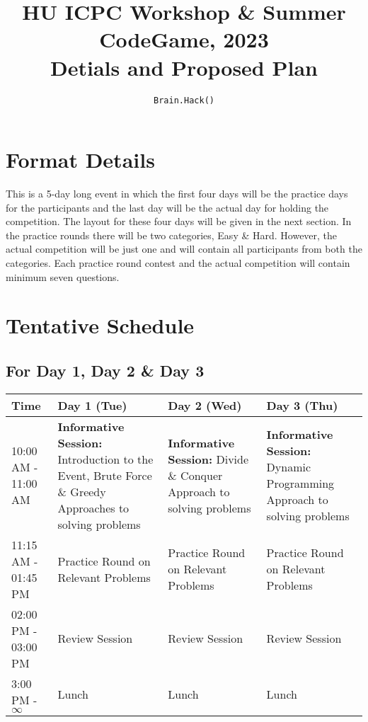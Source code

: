\documentclass[12pt]{article}
\title{HU ICPC Workshop \& Summer CodeGame, 2023 \\ Detials and Proposed Plan}
\author{\texttt{Brain.Hack()}}
\date{}
\begin{document}
\maketitle
\pagebreak

\section*{\centering Format Details}
This is a 5-day long event in which the first four days will be the practice days for the participants and the last day will be the actual day for holding the competition. The layout for these four days will be given in the next section. In the practice rounds there will be two categories, Easy \& Hard. However, the actual competition will be just one and will contain all participants from both the categories. Each practice round contest and the actual competition will contain minimum seven questions.

\section*{\centering Tentative Schedule}
\subsection*{\centering For Day 1, Day 2 \& Day 3}
\begin{table}[H]
    \centering
    \begin{tabular}{|p{2.1cm}|p{4.3cm}|p{4.3cm}|p{4.3cm}|}
    \hline
    Time & Day 1 (Tue) & Day 2 (Wed) & Day 3 (Thu) \\ 
    \hline
    10:00 AM - 11:00 AM & \textbf{Informative Session:} Introduction to the Event, Brute Force \& Greedy Approaches to solving problems & \textbf{Informative Session:} Divide \& Conquer Approach to solving problems  & \textbf{Informative Session:} Dynamic Programming Approach to solving problems \\
    \hline
    11:15 AM - 01:45 PM & Practice Round on Relevant Problems & Practice Round on Relevant Problems & Practice Round on Relevant Problems \\
    \hline
    02:00 PM - 03:00 PM & Review Session & Review Session & Review Session \\
    \hline
    3:00 PM - $\infty$ & Lunch & Lunch & Lunch \\
    \hline
    \end{tabular}
\end{table}
\end{document}
